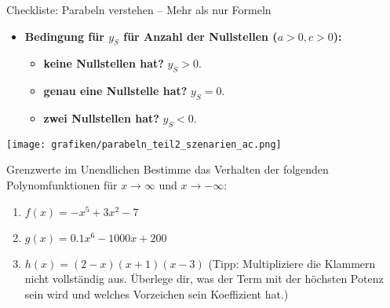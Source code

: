 \begin{loesungsumgebung}{Checkliste: Parabeln verstehen – Mehr als nur Formeln}
\begin{enumerate}[label=\textbf{Teil \arabic*:}]
\begin{enumerate}[label=(\alph*)]
\begin{itemize}
            \item \textbf{Bedingung für $y_S$ für Anzahl der Nullstellen ($a>0, c>0$):}
            \begin{itemize}
                \item \textbf{keine Nullstellen hat?} $y_S > 0$.
                \item \textbf{genau eine Nullstelle hat?} $y_S = 0$.
                \item \textbf{zwei Nullstellen hat?} $y_S < 0$.
            \end{itemize}
        \end{itemize}
    \end{enumerate}
    \begin{center}
    \texttt{[image: grafiken/parabeln\_teil2\_szenarien\_ac.png]}
    \label{fig:parabeln_teil2_szenarien_ac}
    \end{center}

\end{enumerate}

\end{loesungsumgebung}


\begin{aufgabenumgebung}{Grenzwerte im Unendlichen}
Bestimme das Verhalten der folgenden Polynomfunktionen für $x \to \infty$ und $x \to -\infty$:
\begin{enumerate}
    \item $f(x) = -x^5 + 3x^2 - 7$
    \item $g(x) = 0.1x^6 - 1000x + 200$
    \item $h(x) = (2-x)(x+1)(x-3)$ (Tipp: Multipliziere die Klammern nicht vollständig aus. Überlege dir, was der Term mit der höchsten Potenz sein wird und welches Vorzeichen sein Koeffizient hat.)
\end{enumerate}
\end{aufgabenumgebung}

